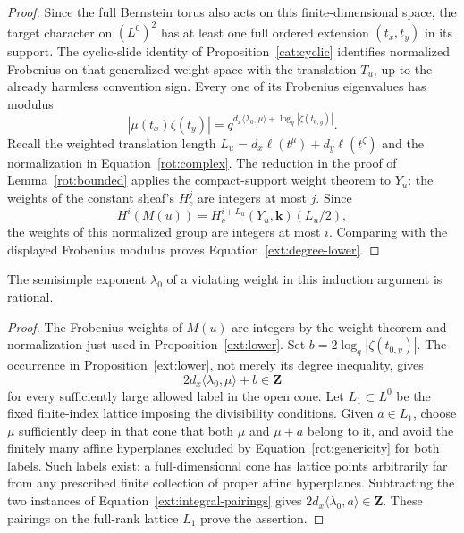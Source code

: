 \begin{proof}
 Since the full Bernstein torus also acts on this finite-dimensional
 space, the target character on $(L^0)^2$ has at least one full ordered
 extension $(t_x,t_y)$ in its support.  The cyclic-slide identity of
 Proposition~\ref{cat:cyclic} identifies normalized Frobenius on that
 generalized weight space with the translation $T_u$, up to the
 already harmless convention sign.  Every one of its Frobenius
 eigenvalues has modulus
 \[
   |\mu(t_x)\zeta(t_y)|
       =q^{d_x\langle\lambda_0,\mu\rangle
                                  +\log_q|\zeta(t_{0,y})|}.
 \]
 Recall the weighted translation length
 $L_u=d_x\ell(t^\mu)+d_y\ell(t^\zeta)$ and the normalization in
 Equation~\eqref{rot:complex}.  The reduction in the
 proof of Lemma~\ref{rot:bounded} applies the compact-support weight
 theorem \cite[Corollary~3.3.4]{DeligneII} to $Y_u$: the weights of
 the constant sheaf's $H_c^j$ are integers at most $j$.  Since
 \[
    H^i(M(u))=H_c^{i+L_u}(Y_u,\mathbf k)(L_u/2),
 \]
 the weights of this normalized group are integers at most $i$.
 Comparing with the displayed Frobenius modulus proves
 Equation~\eqref{ext:degree-lower}.
\end{proof}

\begin{corollary}\label{ext:rationality}
 The semisimple exponent $\lambda_0$ of a violating weight in this
 induction argument is rational.
\end{corollary}

\begin{proof}
 The Frobenius weights of $M(u)$ are integers by the weight theorem
 and normalization just used in Proposition~\ref{ext:lower}.  Set $b=2\log_q|\zeta(t_{0,y})|$.  The occurrence in
 Proposition~\ref{ext:lower}, not merely its degree inequality, gives
 \begin{equation}\label{ext:integral-pairings}
       2d_x\langle\lambda_0,\mu\rangle+b\in\mathbf Z
 \end{equation}
 for every sufficiently large allowed label in the open cone.
 Let $L_1\subset L^0$ be the fixed finite-index lattice imposing the
 divisibility conditions.  Given $a\in L_1$, choose $\mu$ sufficiently
 deep in that cone that both $\mu$ and $\mu+a$ belong to it, and avoid
 the finitely many affine hyperplanes excluded by
 Equation~\eqref{rot:genericity} for both labels.  Such labels exist:
 a full-dimensional cone has lattice points arbitrarily far from any
 prescribed finite collection of proper affine hyperplanes.
 Subtracting the two instances of
 Equation~\eqref{ext:integral-pairings} gives
 $2d_x\langle\lambda_0,a\rangle\in\mathbf Z$.  These pairings on the
 full-rank lattice $L_1$ prove the assertion.
\end{proof}

